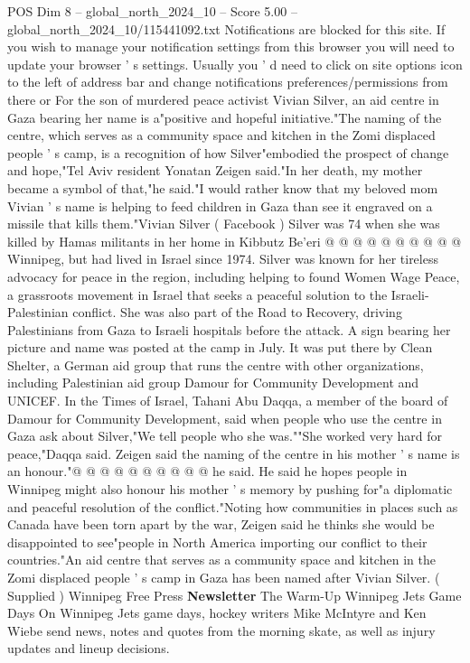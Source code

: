 \begin{textsample}{POS Dim 8 – global\_north\_2024\_10 – Score 5.00 – global\_north\_2024\_10/115441092.txt}  \label{ex:f8_pos_244}
Notifications are blocked for this site.
If you wish to manage your notification settings from this browser you will need to update your browser ' s settings.
Usually you ' d need to click on site options icon to the left of address bar and change notifications preferences/permissions from there or For the son of murdered peace activist Vivian Silver, an aid centre in Gaza bearing her name is a"positive and hopeful initiative."The naming of the centre, which serves as a community space and kitchen in the Zomi displaced people ' s camp, is a recognition of how Silver"embodied the prospect of change and hope,"Tel Aviv resident Yonatan Zeigen said."In her death, my mother became a symbol of that,"he said."I would rather know that my beloved mom Vivian ' s name is helping to feed children in Gaza than see it engraved on a missile that kills them."Vivian Silver ( Facebook ) Silver was 74 when she was killed by Hamas militants in her home in Kibbutz Be'eri @ @ @ @ @ @ @ @ @ @ Winnipeg, but had lived in Israel since 1974.
Silver was known for her tireless advocacy for peace in the region, including helping to found Women Wage Peace, a grassroots movement in Israel that seeks a peaceful solution to the Israeli-Palestinian conflict.
She was also part of the Road to Recovery, driving Palestinians from Gaza to Israeli hospitals before the attack.
A sign bearing her picture and name was posted at the camp in July.
It was put there by Clean Shelter, a German aid group that runs the centre with other organizations, including Palestinian aid group Damour for Community Development and UNICEF.
In the Times of Israel, Tahani Abu Daqqa, a member of the board of Damour for Community Development, said when people who use the centre in Gaza ask about Silver,"We tell people who she was.""She worked very hard for peace,"Daqqa said.
Zeigen said the naming of the centre in his mother ' s name is an honour."@ @ @ @ @ @ @ @ @ @ he said.
He said he hopes people in Winnipeg might also honour his mother ' s memory by pushing for"a diplomatic and peaceful resolution of the conflict."Noting how communities in places such as Canada have been torn apart by the war, Zeigen said he thinks she would be disappointed to see"people in North America importing our conflict to their countries."An aid centre that serves as a community space and kitchen in the Zomi displaced people ' s camp in Gaza has been named after Vivian Silver. ( Supplied ) Winnipeg Free Press \textbf{Newsletter} The Warm-Up Winnipeg Jets Game Days On Winnipeg Jets game days, hockey writers Mike McIntyre and Ken Wiebe send news, notes and quotes from the morning skate, as well as injury updates and lineup decisions.

\end{textsample}
